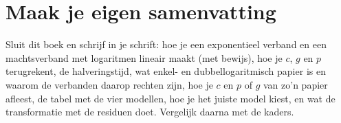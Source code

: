 
\begin{oefeningen}






\end{oefeningen}


\ifzelfstudie
\section*{Maak je eigen samenvatting}
Sluit dit boek en schrijf in je schrift: hoe je een exponentieel verband en een machtsverband met logaritmen lineair maakt (met bewijs), hoe je $c$, $g$ en $p$ terugrekent, de halveringstijd, wat enkel- en dubbellogaritmisch papier is en waarom de verbanden daarop rechten zijn, hoe je $c$ en $p$ of $g$ van zo'n papier afleest, de tabel met de vier modellen, hoe je het juiste model kiest, en wat de transformatie met de residuen doet. Vergelijk daarna met de kaders.
\fi
